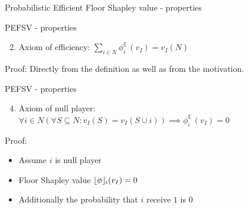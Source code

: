 \documentclass{beamer}
\newcommand{\floor}[1]{\left\lfloor #1 \right\rfloor}
\newcommand{\floorphi}{\ensuremath{\floor{\phi}\hspace{-0.5ex}}}
\DeclareMathOperator{\E}{\mathbb{E}\,}
\begin{document}


\begin{frame}{Probabilistic Efficient Floor Shapley value - properties}
    \pause
    \begin{block}{PEFSV - properties}
        \begin{enumerate}
            \setcounter{enumi}{1}
            \item Axiom of efficiency: $\sum_{i \in N}\phi_{i}^{\E}(v_I) = v_I(N)$
        \end{enumerate}
    \end{block}
    \pause
    Proof: Directly from the definition as well as from the motivation.

    \pause
    \begin{block}{PEFSV - properties}
        \begin{enumerate}
            \setcounter{enumi}{3}
            \item Axiom of null player: $\forall i \in N(\forall S \subseteq N: v_I(S)=v_I(S \cup i)) \implies \phi_{i}^{\E}(v_I) = 0$
        \end{enumerate}
    \end{block}

    \pause
    Proof:
    \begin{itemize}
        \pause
        \item Assume $i$ is null player
        \pause
        \item Floor Shapley value $\floorphi_i(v_I) = 0$
        \pause
        \item Additionally the probability that $i$ receive $1$ is $0$
    \end{itemize}

\end{frame}


\end{document}
